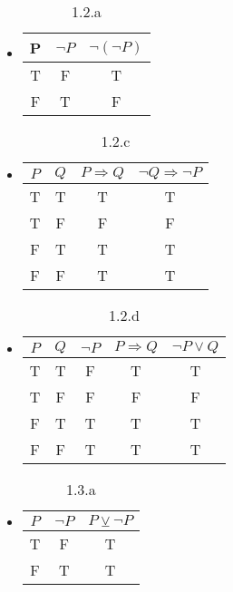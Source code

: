 \documentclass{homework}
\begin{document}
\begin{solution}
  \begin{itemize}
    \item 
      \begin{table}[htpb]
        \centering
        \caption{1.2.a}
        \begin{tabular}{c|c|c}
          P & $\neg P$ & $\neg(\neg P)$ \\
          \toprule
          \bottomrule
          T & F & T \\
          F & T & F
        \end{tabular}
      \end{table}
    \item
      \begin{table}[htpb]
        \centering
        \caption{1.2.c}
        \begin{tabular}{c|c|c|c}
          $P$ & $Q$ & $P\Rightarrow Q$ & $\neg Q \Rightarrow \neg P$ \\
          \toprule
          \bottomrule
          T & T & T & T \\
          T & F & F & F \\
          F & T & T & T \\
          F & F & T & T
        \end{tabular}
      \end{table}
    \item
      \begin{table}[htpb]
        \centering
        \caption{1.2.d}
        \begin{tabular}{c|c|c|c|c}
          $P$ & $Q$ & $\neg P$& $P\Rightarrow Q$ & $\neg P \lor Q$ \\
          \toprule
          \bottomrule
          T & T & F & T & T \\
          T & F & F & F & F \\
          F & T & T & T & T \\
          F & F & T & T & T
        \end{tabular}
      \end{table}
      \clearpage
    \item
      \begin{table}[htpb]
        \centering
        \caption{1.3.a}
        \begin{tabular}{c|c|c}
          $P$ & $\neg P$ & $P\veebar \neg P$ \\
          \toprule
          \bottomrule
          T & F & T \\
          F & T & T 

\end{tabular}
\end{table}
\end{itemize}
\end{solution}
\end{document}

